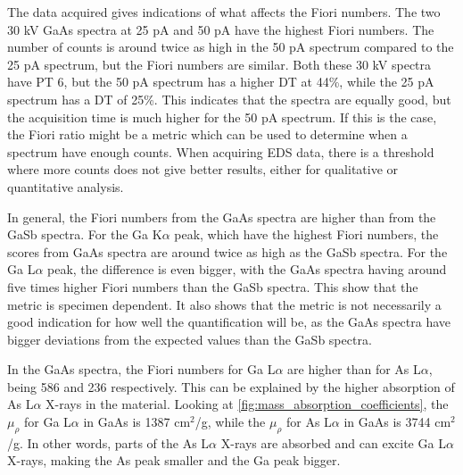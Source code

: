 The data acquired gives indications of what affects the Fiori numbers.
The two 30 kV GaAs spectra at 25 pA and 50 pA have the highest Fiori numbers.
The number of counts is around twice as high in the 50 pA spectrum compared to the 25 pA spectrum, but the Fiori numbers are similar.
Both these 30 kV spectra have PT 6, but the 50 pA spectrum has a higher DT at 44\%, while the 25 pA spectrum has a DT of 25\%.
This indicates that the spectra are equally good, but the acquisition time is much higher for the 50 pA spectrum.
If this is the case, the Fiori ratio might be a metric which can be used to determine when a spectrum have enough counts.
When acquiring EDS data, there is a threshold where more counts does not give better results, either for qualitative or quantitative analysis.


In general, the Fiori numbers from the GaAs spectra are higher than from the GaSb spectra.
For the Ga K$\alpha$ peak, which have the highest Fiori numbers, the scores from GaAs spectra are around twice as high as the GaSb spectra.
For the Ga L$\alpha$ peak, the difference is even bigger, with the GaAs spectra having around five times higher Fiori numbers than the GaSb spectra.
This show that the metric is specimen dependent.
It also shows that the metric is not necessarily a good indication for how well the quantification will be, as the GaAs spectra have bigger deviations from the expected values than the GaSb spectra.



In the GaAs spectra, the Fiori numbers for Ga L$\alpha$ are higher than for As L$\alpha$, being 586 and 236 respectively.
This can be explained by the higher absorption of As L$\alpha$ X-rays in the material.
Looking at \cref{fig:mass_absorption_coefficients}, the $\mu_\rho$ for Ga L$\alpha$ in GaAs is 1387 cm$^2$/g, while the $\mu_\rho$ for As L$\alpha$ in GaAs is 3744 cm$^2$/g.
In other words, parts of the As L$\alpha$ X-rays are absorbed and can excite Ga L$\alpha$ X-rays, making the As peak smaller and the Ga peak bigger.


